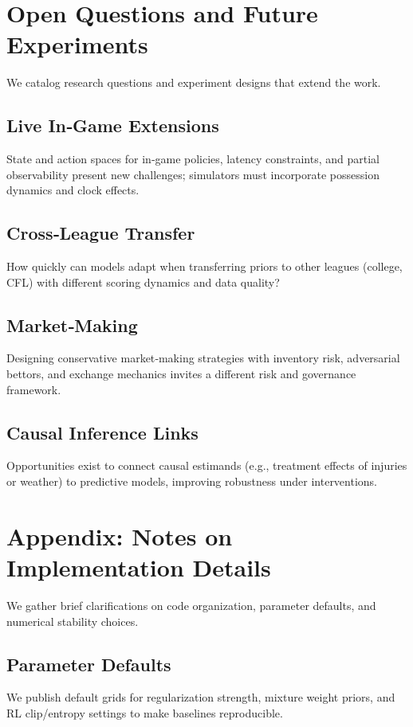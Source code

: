 \documentclass[12pt]{report}  %
\numberwithin{equation}{section}
\theoremstyle{plain}
\theoremstyle{definition}
\theoremstyle{remark}
\begin{document}
\chapter{Open Questions and Future Experiments}
We catalog research questions and experiment designs that extend the work.

\section{Live In‑Game Extensions}
State and action spaces for in‑game policies, latency constraints, and partial observability present new challenges; simulators must incorporate possession dynamics and clock effects.

\section{Cross‑League Transfer}
How quickly can models adapt when transferring priors to other leagues (college, CFL) with different scoring dynamics and data quality?

\section{Market‑Making}
Designing conservative market‑making strategies with inventory risk, adversarial bettors, and exchange mechanics invites a different risk and governance framework.

\section{Causal Inference Links}
Opportunities exist to connect causal estimands (e.g., treatment effects of injuries or weather) to predictive models, improving robustness under interventions.

\chapter{Appendix: Notes on Implementation Details}
We gather brief clarifications on code organization, parameter defaults, and numerical stability choices.

\section{Parameter Defaults}
We publish default grids for regularization strength, mixture weight priors, and RL clip/entropy settings to make baselines reproducible.
\end{document}
